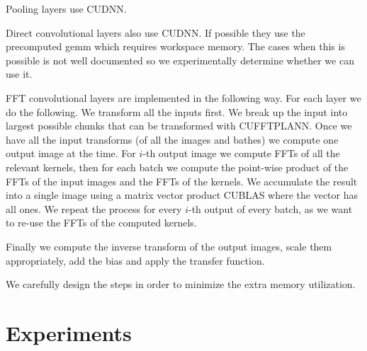 \documentclass[conference]{IEEEtran}
\begin{document}
Pooling layers use CUDNN.

Direct convolutional layers also use CUDNN.  If possible they use the
precomputed gemm which requires workspace memory.  The cases when this
is possible is not well documented so we experimentally determine
whether we can use it.

FFT convolutional layers are implemented in the following way.  For
each layer we do the following.  We transform all the inputs first.
We break up the input into largest possible chunks that can be
transformed with CUFFTPLANN.  Once we have all the input transforms
(of all the images and bathes) we compute one output image at the
time.  For $i$-th output image we compute FFTs of all the relevant
kernels, then for each batch we compute the point-wise product of the
FFTs of the input images and the FFTs of the kernels.  We accumulate
the result into a single image using a matrix vector product CUBLAS
where the vector has all ones.  We repeat the process for every $i$-th
output of every batch, as we want to re-use the FFTs of the computed
kernels.

Finally we compute the inverse transform of the output images, scale
them appropriately, add the bias and apply the transfer function.

We carefully design the steps in order to minimize the extra memory
utilization.


\section{Experiments}


{\small


}
\end{document}
